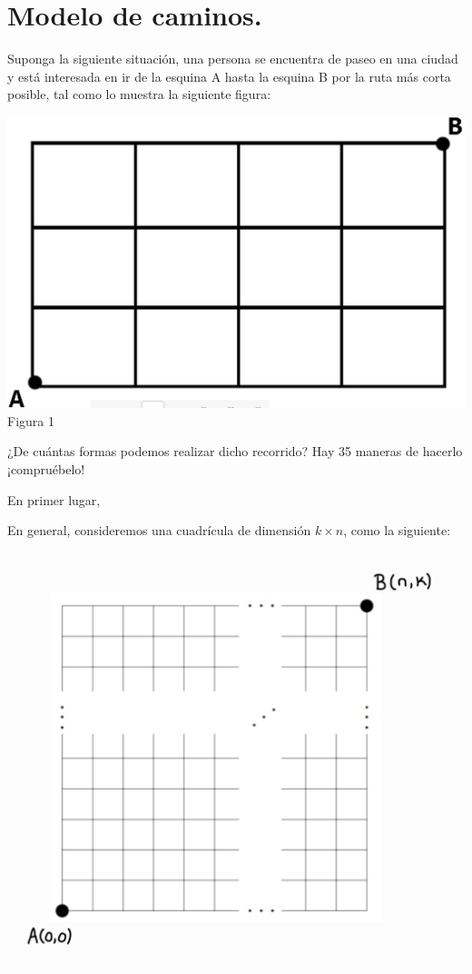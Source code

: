 \section{Modelo de caminos.}



Suponga  la  siguiente  situación,  una  persona se encuentra de paseo en una ciudad y está interesada en ir de la esquina A hasta la esquina B por la ruta más corta posible, tal como lo muestra la siguiente figura:

\begin{center}

    \includegraphics[scale=0.25]{Imagenes/IMG4/caminos_1.png}\\
    Figura 1
\end{center}

¿De cuántas formas podemos realizar dicho recorrido? Hay 35 maneras de hacerlo ¡compruébelo!



En primer lugar,  

En general, consideremos una cuadrícula de dimensión $k \times n$, como la siguiente:

\begin{center}
    \includegraphics[scale=0.2]{Imagenes/IMG4/caminos_2.jpg}
\end{center}

